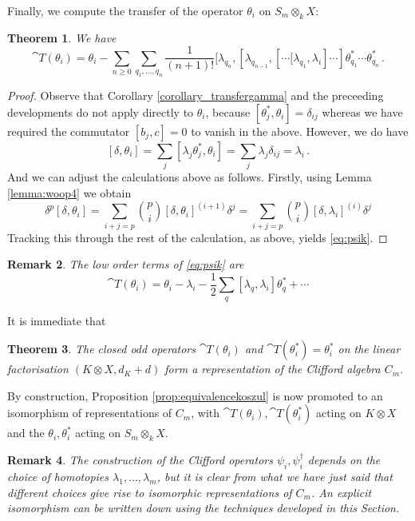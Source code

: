 \documentclass[english,letter paper,12pt,leqno]{article}
\newtheorem{theorem}{Theorem}[section]
\theoremstyle{example}
\newtheorem{remark}[theorem]{Remark}
\numberwithin{equation}{section}
\def\be{\begin{equation}}
\def\ee{\end{equation}}
\begin{document}
Finally, we compute the transfer of the operator $\theta_i$ on $S_m \otimes_k X$:

\begin{theorem}\label{theorem:psik} We have
\begin{equation}\label{eq:psik}
\cat{T}(\theta_i) = \theta_i - \sum_{n \ge 0} \sum_{q_1,\ldots,q_n} \frac{1}{(n+1)!} [ \lambda_{q_n}, [ \lambda_{q_{n-1}}, [ \cdots \big[ \lambda_{q_1}, \lambda_i ] \cdots ] \theta_{q_1}^* \cdots \theta_{q_n}^*\,.
\end{equation}
\end{theorem}
\begin{proof}
Observe that Corollary \ref{corollary_transfergamma} and the preceeding developments do not apply directly to $\theta_i$, because $[ \theta_j^*, \theta_i ] = \delta_{ij}$ whereas we have required the commutator $[b_j,c] = 0$ to vanish in the above. However, we do have
\[
[ \delta, \theta_i ] = \sum_j [ \lambda_j \theta_j^*, \theta_i ] = \sum_j \lambda_j \delta_{ij} = \lambda_i\,.
\]
And we can adjust the calculations above as follows. Firstly, using Lemma \ref{lemma:woop4} we obtain
\[
\delta^p [\delta, \theta_i] = \sum_{i+j=p} \binom{p}{i} [\delta, \theta_i]^{(i+1)} \delta^j = \sum_{i+j=p} \binom{p}{i} [\delta, \lambda_i]^{(i)} \delta^j
\]
Tracking this through the rest of the calculation, as above, yields \eqref{eq:psik}.
\end{proof}

\begin{remark} The low order terms of \eqref{eq:psik} are
\be
\cat{T}(\theta_i) = \theta_i - \lambda_i - \frac{1}{2} \sum_q [\lambda_q, \lambda_i] \theta^*_q + \cdots
\ee
\end{remark}

It is immediate that

\begin{theorem} The closed odd operators $\cat{T}(\theta_i)$ and $\cat{T}(\theta_i^*) = \theta_i^*$ on the linear factorisation $(K \otimes X, d_K + d)$ form a representation of the Clifford algebra $C_m$.
\end{theorem}

By construction, Proposition \ref{prop:equivalencekoszul} is now promoted to an isomorphism of representations of $C_m$, with $\cat{T}(\theta_i), \cat{T}(\theta_i^*)$ acting on $K \otimes X$ and the $\theta_i, \theta_i^*$ acting on $S_m \otimes_k X$. 

\begin{remark} The construction of the Clifford operators $\psi_i, \psi_i^\dagger$ depends on the choice of homotopies $\lambda_1,\ldots,\lambda_m$, but it is clear from what we have just said that different choices give rise to isomorphic representations of $C_m$. An explicit isomorphism can be written down using the techniques developed in this Section.
\end{remark}
\end{document}
